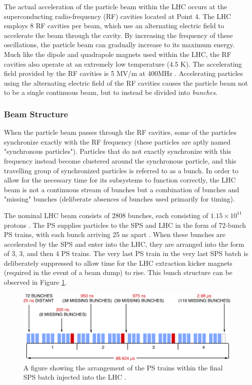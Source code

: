 \documentclass[12pt,a4paper,epsf,portrait,times,epsfig]{article}
\begin{document}
		The actual acceleration of the particle beam within the LHC occurs at the superconducting radio-frequency (RF) cavities located at Point 4. The LHC employs 8 RF cavities per beam, which use an alternating electric field to accelerate the beam through the cavity. By increasing the frequency of these oscillations, the particle beam can gradually increase to its maximum energy. Much like the dipole and quadrapole magnets used within the LHC, the RF cavities also operate at an extremely low temperature (4.5 K). The accelerating field provided by the RF cavities is 5 MV/m at 400MHz \cite{LHCRF}. Accelerating particles using the alternating electric field of the RF cavities causes the particle beam not to be a single continuous beam, but to instead be divided into \textit{bunches}.
		
		\subsubsection{Beam Structure}
		

		When the particle beam passes through the RF cavities, some of the particles synchronize exactly with the RF frequency (these particles are aptly named "synchronous particles"). Particles that do not exactly synchronize with this frequency instead become clustered around the synchronous particle, and this travelling group of synchronized particles is referred to as a bunch. In order to allow for the necessary time for its subsystems to function correctly, the LHC beam is not a continuous stream of bunches but a combination of bunches and "missing" bunches (deliberate absences of bunches used primarily for timing). \par

		The nominal LHC beam consists of 2808 bunches, each consisting of $1.15 \times 10^{11}$ protons \cite{LHCDesignV1,LHCDesignV3}. The PS supplies particles to the SPS and LHC in the form of 72-bunch PS trains, with each bunch arriving 25 ns apart \cite{LHCBeam}. When these bunches are accelerated by the SPS and enter into the LHC, they are arranged into the form of 3, 3, and then 4 PS trains. The very last PS train in the very last SPS batch is deliberately suppressed to allow time for the LHC extraction kicker magnets (required in the event of a beam dump) to rise. This bunch structure can be observed in Figure \ref{Fig:LHCBunches}. 

		\begin{figure}
			\centering
			\includegraphics[scale=0.3]{LHC_Beam_Structure}
			\caption{A figure showing the arrangement of the PS trains within the final SPS batch injected into the LHC \cite{LHCBunches}.}
			\label{Fig:LHCBunches}
		\end{figure}
\end{document}
